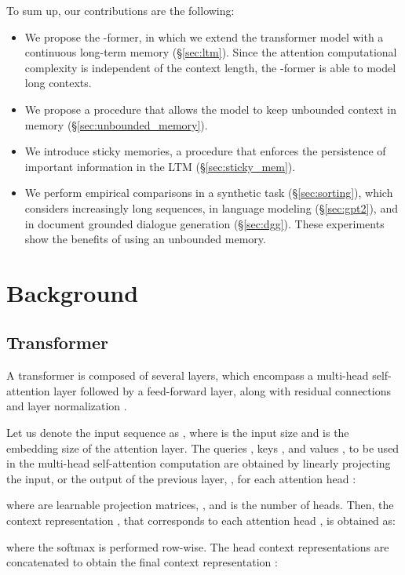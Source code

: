 \documentclass[11pt]{article}
\begin{document}
To sum up, our contributions are the following:
 \begin{itemize}
     \item We propose the \mbox{-former}, in which we extend the transformer model with a continuous long-term memory (\S \ref{sec:ltm}). Since the attention computational complexity is independent of the context length, the \mbox{-former} is able to model long contexts.
     \item We propose a procedure that allows the model to keep unbounded context in memory (\S \ref{sec:unbounded_memory}).
    \item We introduce sticky memories, a procedure that enforces the persistence of important information in the LTM (\S \ref{sec:sticky_mem}). 
     \item We perform empirical comparisons in a synthetic task (\S \ref{sec:sorting}), which considers increasingly long sequences, in language modeling (\S \ref{sec:gpt2}), and in document grounded dialogue generation (\S \ref{sec:dgg}). These experiments show the benefits of using an unbounded memory. 
 \end{itemize}
 

\section{Background}

\subsection{Transformer}
\label{sec:transformer}
A transformer \cite{vaswani2017attention} is composed of several layers, which encompass a multi-head self-attention layer followed by a feed-forward layer, along with residual connections \cite{he2016deep} and layer normalization \cite{ba2016layer}.

Let us denote the input sequence as , where  is the input size and  is the embedding size of the attention layer.
The queries , keys , and values , to be used in the multi-head self-attention computation are obtained by linearly projecting the input, or the output of the previous layer, , for each attention head : 

where  are learnable projection matrices, , and  is the number of heads. 
Then, the context representation , that corresponds to each attention head , is obtained as:

where the softmax is performed row-wise.
The head context representations are concatenated to obtain the final context representation :
\end{document}
